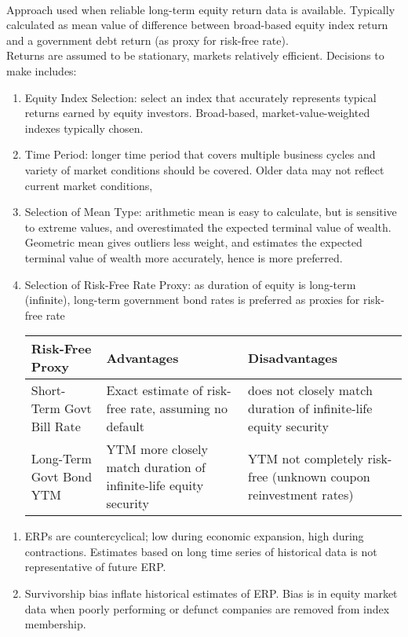 \begin{method} \\
Approach used when reliable long-term equity return data is available. Typically calculated as mean value of difference between broad-based equity index return and a government debt return (as proxy for risk-free rate).\\
Returns are assumed to be stationary, markets relatively efficient. Decisions to make includes:
\begin{enumerate}[label=\roman*.]
\setlength{\itemsep}{0pt}
\item Equity Index Selection: select an index that accurately represents typical returns earned by equity investors. Broad-based, market-value-weighted indexes typically chosen.
\item Time Period: longer time period that covers multiple business cycles and variety of market conditions should be covered. Older data may not reflect current market conditions,
\item Selection of Mean Type: arithmetic mean is easy to calculate, but is sensitive to extreme values, and overestimated the expected terminal value of wealth. Geometric mean gives outliers less weight, and estimates the expected terminal value of wealth more accurately, hence is more preferred.
\item Selection of Risk-Free Rate Proxy: as duration of equity is long-term (infinite), long-term government bond rates is preferred as proxies for risk-free rate\\
\begin{tabularx}{\textwidth}{p{12.5em}|X|X}
\hline
\rowcolor{gray!30}
Risk-Free Proxy & Advantages & Disadvantages \\
\hline
Short-Term Govt Bill Rate & Exact estimate of risk-free rate, assuming no default & does not closely match duration of infinite-life equity security \\
\hline
Long-Term Govt Bond YTM & YTM more closely match duration of infinite-life equity security & YTM not completely risk-free (unknown coupon reinvestment rates) \\
\hline
\end{tabularx}
\end{enumerate}
\end{method}

\begin{remark} 
\begin{enumerate}[label=\roman*.]
\setlength{\itemsep}{0pt}
\item ERPs are countercyclical; low during economic expansion, high during contractions. Estimates based on long time series of historical data is not representative of future ERP.
\item Survivorship bias inflate historical estimates of ERP. Bias is in equity market data when poorly performing or defunct companies are removed from index membership.
\end{enumerate}
\end{remark}

